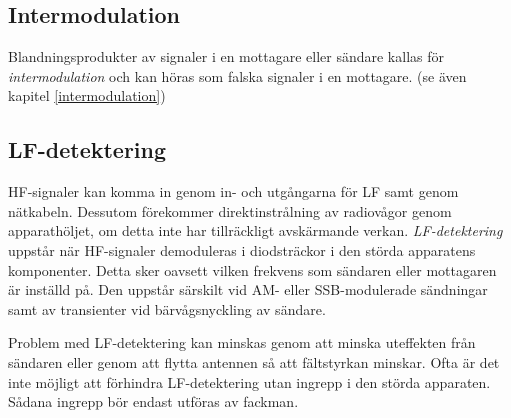 \subsection{Intermodulation}

Blandningsprodukter av signaler i en mottagare eller sändare kallas för
\emph{intermodulation} och kan höras som falska signaler i en mottagare.
(se även kapitel \ref{intermodulation})

\newpage
\subsection{LF-detektering}

HF-signaler kan komma in genom in- och utgångarna för LF samt genom nätkabeln.
Dessutom förekommer direktinstrålning av radiovågor genom apparathöljet, om
detta inte har tillräckligt avskärmande verkan.
\emph{LF-detektering} uppstår när HF-signaler demoduleras i diodsträckor i den
störda apparatens komponenter.
Detta sker oavsett vilken frekvens som sändaren eller mottagaren är inställd på.
Den uppstår särskilt vid AM- eller SSB-modulerade sändningar
samt av transienter vid bärvågsnyckling av sändare.

Problem med LF-detektering kan minskas genom att minska uteffekten från sändaren
eller genom att flytta antennen så att fältstyrkan minskar.
Ofta är det inte möjligt att förhindra LF-detektering utan ingrepp i den störda
apparaten.
Sådana ingrepp bör endast utföras av fackman.
